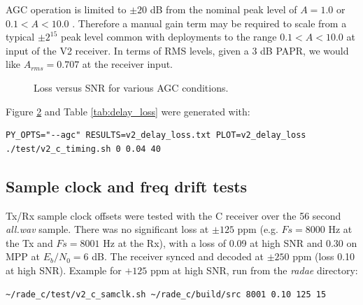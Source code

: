 \documentclass{article}
\begin{document}
AGC operation is limited to $\pm 20$  \si{dB} from the nominal peak level of $A=1.0$ or $0.1<A<10.0$ .  Therefore a manual gain term may be required to scale from a typical $\pm 2^{15}$ peak level common with deployments to the range $0.1<A<10.0$ at input of the V2 receiver.  In terms of RMS levels, given a 3 \si{dB} PAPR, we would like $A_{rms}=0.707$ at the receiver input. 

\begin{figure}[h]
\caption{Loss versus SNR for various AGC conditions.}
\label{fig:260206_inf_loss_SNR3k_models}
\label{fig:260831_inf_loss_SNR3k_models}
\begin{center}
\end{center}
\end{figure}

\clearpage

Figure \ref{fig:v2_delay_loss} and Table \ref{tab:delay_loss} were generated with:
\begin{verbatim}
PY_OPTS="--agc" RESULTS=v2_delay_loss.txt PLOT=v2_delay_loss ./test/v2_c_timing.sh 0 0.04 40
\end{verbatim}

\begin{figure}[h]
\caption{}
\label{fig:v2_delay_loss}
\begin{center}
\end{center}
\end{figure}



\subsection{Sample clock and freq drift tests}

Tx/Rx sample clock offsets were tested with the C receiver over the 56 second \emph{all.wav} sample.  There was no significant loss at $\pm 125$ ppm (e.g. $Fs=8000$ \si{Hz} at the Tx and $Fs=8001$ \si{Hz} at the Rx), with a loss of 0.09 at high SNR and 0.30 on MPP at $E_b/N_0 = 6$ dB.  The receiver synced and decoded at $\pm 250$ ppm (loss 0.10 at high SNR).  Example for $+125$ ppm at high SNR, run from the \emph{radae} directory:

\begin{verbatim}
~/rade_c/test/v2_c_samclk.sh ~/rade_c/build/src 8001 0.10 125 15
\end{verbatim}
\end{document}
